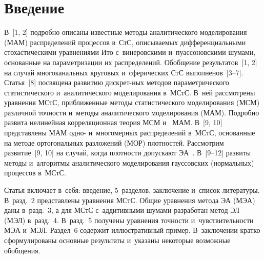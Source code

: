

\vspace*{-2pt}


\thispagestyle{headings}

\begin{multicols}{2}

\label{st\stat}

\section{Введение}


 В~[1, 2] подробно описаны известные методы аналитического моделирования (МАМ) 
 распределений процессов в~СтС, описываемых дифференциальными 
 стохастическими уравнениями Ито с~винеровскими и~пуассоновскими шумами, основанные на 
 параметризации их распределений.
%
Обобщение результатов~[1, 2] на случай многоканальных круговых и~сферических 
СтС выполнено\linebreak в~[3--7].
Статья~[8] посвящена развитию дискрет-\linebreak ных методов параметрического статистического
 и~аналитического моделирования в~МСтС. В~ней рас\-смот\-ре\-ны 
 уравнения МСтС, приближенные методы статистического моделирования (МСМ) различной 
 точности и~методы аналитического моделирования (МАМ). Подробно развита нелинейная 
 корреляционная теория МСМ и~ МАМ. 
 В~[9, 10] пред\-став\-лены МАМ одно- и~многомерных 
 распределений в~МСтС, основанные на методе ортогональных разложений (МОР) плотностей. 
 Рас\-смот\-рим развитие~[9, 10] на случай, когда плотности допускают 
ЭА~\cite{1-sin, 2-sin, 11-sin}.
%
В~[9--12] %
развиты методы и~алгоритмы аналитического 
моделирования гауссовских (нормальных) процессов в~МСтС.

Статья включает в~себя: введение, 5~разделов, заключение и~список литературы. 
В~разд.~2 представлены уравнения МСтС. Общие уравнения метода ЭА (МЭА) даны в~разд.~3, а для МСтС с~аддитивными шумами разработан 
метод ЭЛ (МЭЛ) в~разд.~4.  В~разд.~5 получены уравнения 
точности и~чувствительности МЭА и~МЭЛ. Раздел~6 содержит иллюстративный пример. 
В~заключении кратко сформулированы основные результаты и~указаны некоторые возможные 
обобщения.


\end{multicols}
